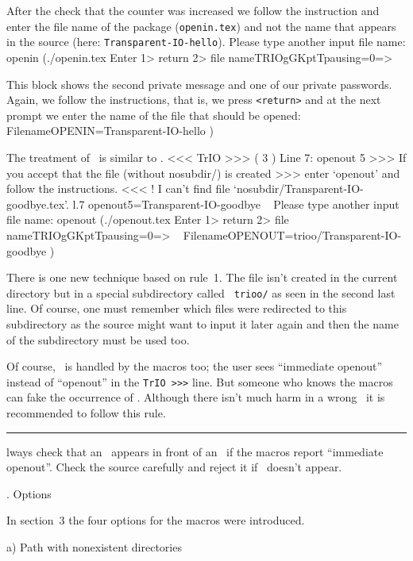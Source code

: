 After the check that the counter was increased we follow the
instruction and enter the file name of the package ({\tt openin.tex})
and not the name that appears in the source (here: {\tt Transparent-IO-hello}).
\beginverbatim
Please type another input file name: openin\parni
(./openin.tex\parni
Enter 1> return 2> file name\ccb\bs TRIOgGKptTpausing=0=>\endverbatim

This block shows the second private message and one of our private
passwords. Again, we follow the instructions, that is, we press
{\tt<return>} and at the next prompt we enter the name of the file
that should be opened:
\beginverbatim
\bs FilenameOPENIN=Transparent-IO-hello\parni
)\endverbatim

The treatment of \cs\openout\ is similar to \cs\openin.
\beginverbatim
<<<\parni
TrIO >>> ( 3 ) Line 7: openout 5\parni
>>> If you accept that the file (without nosubdir/) is created\parni
>>> enter `openout' and follow the instructions.\parni
<<<\parni
! I can't find file `nosubdir/Transparent-IO-goodbye.tex'.\parni
l.7 \bs openout5=Transparent-IO-goodbye\parni
\ \parni
Please type another input file name: openout\parni
(./openout.tex\parni
Enter 1> return 2> file name\ccb\bs TRIOgGKptTpausing=0=>\parni
\ \parni
\bs FilenameOPENOUT=trioo/Transparent-IO-goodbye\parni
)\endverbatim

There is one new technique based on rule~1. The file isn't created in
the current directory but in a special subdirectory called {\tt
trioo/} as seen in the second last line. Of course, one must remember
which files were redirected to this subdirectory as the source might
want to input it later again and then the name of the subdirectory
must be used too.

Of course, \cs\immediate\ is handled by the macros too; the user sees
``immediate openout'' instead of ``openout'' in the {\tt TrIO >>>}
line. But someone who knows the macros can fake the occurrence
of \cs\immediate. Although there isn't much harm in a
wrong \cs\immediate\ it is recommended to follow this rule.

 \rule8 Always check that an \cs\immediate\ appears in front of
an \cs\openout\ if the macros report ``immediate openout''. Check the
source carefully and reject it if \cs\immediate\ doesn't appear.



. Options

In section~3 the four options for the macros were introduced.

\beginsection \rm a) Path with nonexistent directories

